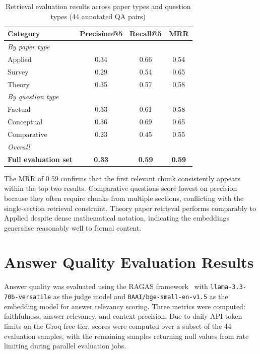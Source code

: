 \documentclass[12pt,a4paper]{report}
\begin{document}
\begin{table}[h]
\centering
\begin{tabular}{lccc}
\toprule
\textbf{Category} & \textbf{Precision@5} & \textbf{Recall@5} & \textbf{MRR} \\
\midrule
\multicolumn{4}{l}{\textit{By paper type}} \\
Applied     & 0.34 & 0.66 & 0.54 \\
Survey      & 0.29 & 0.54 & 0.65 \\
Theory      & 0.35 & 0.57 & 0.58 \\
\midrule
\multicolumn{4}{l}{\textit{By question type}} \\
Factual     & 0.33 & 0.61 & 0.58 \\
Conceptual  & 0.36 & 0.69 & 0.65 \\
Comparative & 0.23 & 0.45 & 0.55 \\
\midrule
\multicolumn{4}{l}{\textit{Overall}} \\
\textbf{Full evaluation set} & \textbf{0.33} & \textbf{0.59} & \textbf{0.59} \\
\bottomrule
\end{tabular}
\caption{Retrieval evaluation results across paper types and question types
(44 annotated QA pairs)}
\label{tab:retrieval_results}
\end{table}

The MRR of 0.59 confirms that the first relevant chunk consistently appears
within the top two results. Comparative questions score lowest on precision
because they often require chunks from multiple sections, conflicting with the
single-section retrieval constraint. Theory paper retrieval performs comparably
to Applied despite dense mathematical notation, indicating the embeddings
generalise reasonably well to formal content.

\section{Answer Quality Evaluation Results}

Answer quality was evaluated using the RAGAS framework~\cite{es2023ragas} with
\texttt{llama-3.3-70b-versatile} as the judge model and
\texttt{BAAI/bge-small-en-v1.5} as the embedding model for answer relevancy
scoring. Three metrics were computed: faithfulness, answer relevancy, and context
precision. Due to daily API token limits on the Groq free tier, scores were
computed over a subset of the 44 evaluation samples, with the remaining samples
returning null values from rate limiting during parallel evaluation jobs.
\end{document}
